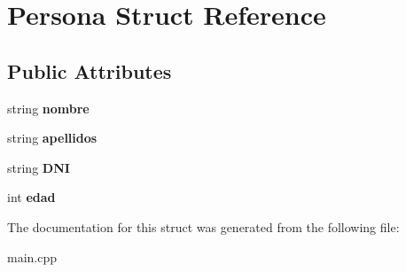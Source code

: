 \hypertarget{struct_persona}{\section{Persona Struct Reference}
\label{struct_persona}
}
\subsection*{Public Attributes}
\begin{DoxyCompactItemize}
\item 
\hypertarget{struct_persona_a08be6fe295c330f6fb2d479d466f2946}{string {\bfseries nombre}}\label{struct_persona_a08be6fe295c330f6fb2d479d466f2946}

\item 
\hypertarget{struct_persona_aa7351e0ae9c5c5117afaa6c7af58a03c}{string {\bfseries apellidos}}\label{struct_persona_aa7351e0ae9c5c5117afaa6c7af58a03c}

\item 
\hypertarget{struct_persona_a6cd1bfb8b4b96620237a97276ff59754}{string {\bfseries D\-N\-I}}\label{struct_persona_a6cd1bfb8b4b96620237a97276ff59754}

\item 
\hypertarget{struct_persona_a3aa1bb715f8dc5356a33d942716b4a49}{int {\bfseries edad}}\label{struct_persona_a3aa1bb715f8dc5356a33d942716b4a49}

\end{DoxyCompactItemize}


The documentation for this struct was generated from the following file\-:\begin{DoxyCompactItemize}
\item 
main.\-cpp\end{DoxyCompactItemize}
